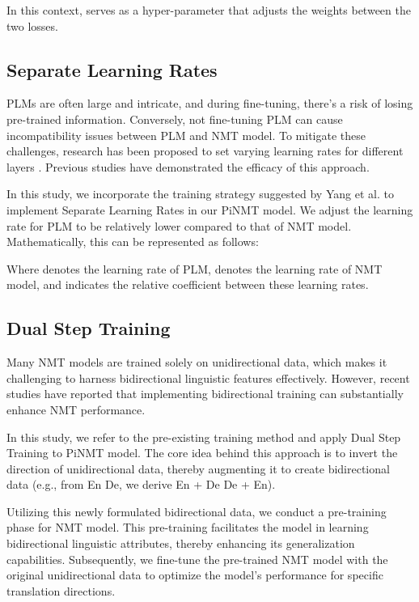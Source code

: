 \documentclass[conference]{IEEEtran}
\begin{document}
In this context,  serves as a hyper-parameter that adjusts the weights between the two losses.

\subsection{Separate Learning Rates}
PLMs are often large and intricate, and during fine-tuning, there's a risk of losing pre-trained information. Conversely, not fine-tuning PLM can cause incompatibility issues between PLM and NMT model. To mitigate these challenges, research has been proposed to set varying learning rates for different layers \cite{Howard2018, Sun2019, Yang2019}. Previous studies have demonstrated the efficacy of this approach.

In this study, we incorporate the training strategy suggested by Yang et al. \cite{Yang2019} to implement Separate Learning Rates in our PiNMT model. We adjust the learning rate for PLM to be relatively lower compared to that of NMT model. Mathematically, this can be represented as follows:



Where  denotes the learning rate of PLM,  denotes the learning rate of NMT model, and  indicates the relative coefficient between these learning rates.




\subsection{Dual Step Training}
Many NMT models are trained solely on unidirectional data, which makes it challenging to harness bidirectional linguistic features effectively. However, recent studies \cite{ding2021bidirectional, xu2021bibert} have reported that implementing bidirectional training can substantially enhance NMT performance.

In this study, we refer to the pre-existing training method \cite{xu2021bibert} and apply Dual Step Training to PiNMT model. The core idea behind this approach is to invert the direction of unidirectional data, thereby augmenting it to create bidirectional data (e.g., from En  De, we derive En + De  De + En).

Utilizing this newly formulated bidirectional data, we conduct a pre-training phase for NMT model. This pre-training facilitates the model in learning bidirectional linguistic attributes, thereby enhancing its generalization capabilities. Subsequently, we fine-tune the pre-trained NMT model with the original unidirectional data to optimize the model's performance for specific translation directions.
\end{document}
